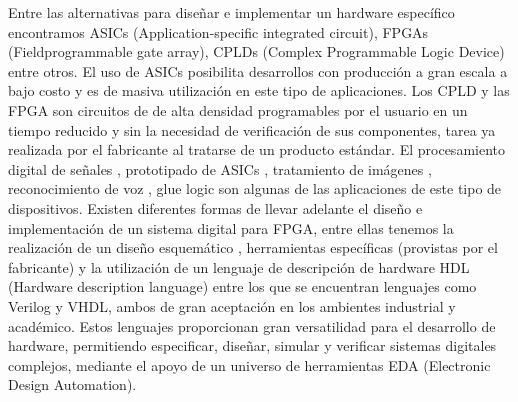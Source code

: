 \documentclass[a4paper,11pt]{article}
\begin{document}

Entre las alternativas para diseñar e implementar un hardware específico encontramos ASICs (Application-specific integrated circuit), FPGAs (Fieldprogrammable
gate array), CPLDs (Complex Programmable Logic Device) entre otros.
El uso de ASICs posibilita desarrollos con producción a gran escala a bajo costo y es de masiva utilización en este tipo de aplicaciones. Los CPLD y las FPGA son circuitos de de alta densidad programables por el usuario en un tiempo reducido y sin la necesidad de verificación de sus componentes, tarea ya realizada por el fabricante al tratarse de un
producto estándar. El procesamiento digital de señales , prototipado de ASICs , tratamiento de imágenes , reconocimiento de voz , glue logic son algunas de las aplicaciones
de este tipo de dispositivos. Existen diferentes formas de llevar adelante el diseño e implementación de un sistema digital para FPGA, entre ellas tenemos la realización de un
diseño esquemático , herramientas específicas (provistas por el fabricante) y la utilización de un lenguaje de descripción de hardware HDL (Hardware description language) entre los que se encuentran lenguajes como Verilog y VHDL, ambos de gran aceptación en los ambientes industrial y académico. Estos lenguajes proporcionan gran versatilidad para
el desarrollo de hardware, permitiendo especificar, diseñar, simular y verificar sistemas digitales complejos, mediante el apoyo de un universo de herramientas EDA (Electronic
Design Automation).
\end{document}

